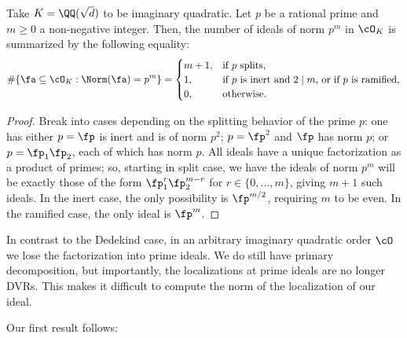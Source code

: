 \documentclass[11pt, proquest]{uwthesis}
\begin{document}
\begin{proposition}\label{Dedekind:Prop}
  Take $K =\QQ(\sqrt{d})$ to be imaginary quadratic. Let $p$ be a rational prime and $m\geq 0$ a non-negative integer. Then, the number of ideals of norm $p^m$ in $\cO_K$ is summarized by the following equality:
  \[
    \#\{\fa\subseteq \cO_K: \Norm(\fa) = p^m\} =
    \begin{cases}
      m+1 , &
      \textup{if } p \textup{ splits,}           \\
      1 ,   &
      \textup{if } p \textup{ is inert and } 2\mid m
      \textup{, or if } p \textup{ is ramified}, \\
      0 ,   &
      \textup{otherwise.}
    \end{cases}
  \]
\end{proposition}
\begin{proof}
  Break into cases depending on the splitting behavior of the prime $p$: one has either $p = \fp$ is inert and is of norm $p^2$; $p = \fp^2$ and $\fp$ has norm $p$; or $p = \fp_1\fp_2$, each of which has norm $p$.
  All ideals have a unique factorization as a product of primes; so, starting in split case, we have the ideals of norm $p^m$ will be exactly those of the form $\fp_1^r\fp_2^{m-r}$ for $r \in\{0,\ldots,m\}$, giving $m+1$ such ideals. In the inert case, the only possibility is $\fp^{m/2}$, requiring $m$ to be even. In the ramified case, the only ideal is $\fp^m$.
\end{proof}

In contrast to the Dedekind case, in an arbitrary imaginary quadratic order $\cO$ we lose the factorization into prime ideals. We do still have primary decomposition, but importantly, the localizations at prime ideals are no longer DVRs. This makes it difficult to compute the norm of the localization of our ideal.

Our first result follows:
\end{document}
